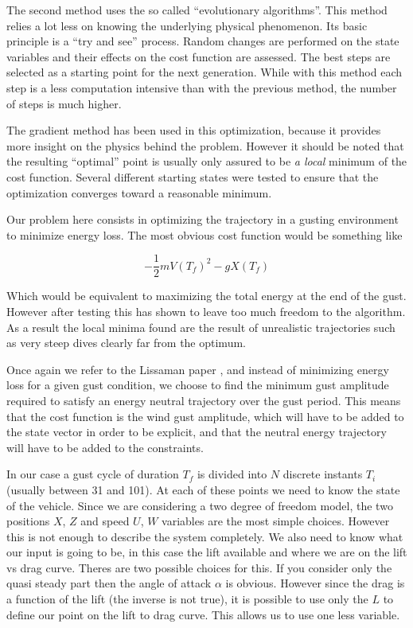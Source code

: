 \par The second method uses the so called ``evolutionary algorithms''. 
This method relies a lot less on knowing the underlying physical phenomenon.
Its basic principle is a ``try and see'' process.
Random changes are performed on the state variables and their effects on the cost function are assessed.
The best steps are selected as a starting point for the next generation.
While with this method each step is a less computation intensive than with the previous method, the number of steps is much higher.

\par The gradient method has been used in this optimization, because it provides more insight on the physics behind the problem.
However it should be noted that the resulting ``optimal'' point is usually only assured to be \emph{a local} minimum of the cost function.
Several different starting states were tested to ensure that the optimization converges toward a reasonable minimum.

Our problem here consists in optimizing the trajectory in a gusting environment to minimize energy loss.
The most obvious cost function would be something like

\begin{equation}
  - \frac{1}{2}m{V(T_f)}^2 - gX(T_f)
  \label{eqn:eni_cost_fun}
\end{equation}

Which would be equivalent to maximizing the total energy at the end of the gust.
However after testing this has shown to leave too much freedom to the algorithm. 
As a result the local minima found are the result of unrealistic trajectories such as very steep dives clearly far from the optimum.

\par Once again we refer to the Lissaman paper \cite{Lissaman2007neutral}, and instead of minimizing energy loss for a given gust condition, we choose to find the minimum gust amplitude required to satisfy an energy neutral trajectory over the gust period.
This means that the cost function is the wind gust amplitude, which will have to be added to the state vector in order to be explicit, and that the neutral energy trajectory will have to be added to the constraints.

In our case a gust cycle of duration $T_f$ is divided into $N$ discrete instants $T_i$ (usually between 31 and 101).
At each of these points we need to know the state of the vehicle.
Since we are considering a two degree of freedom model, the two positions $X$, $Z$ and speed $U$, $W$ variables are the most simple choices.
However this is not enough to describe the system completely.
We also need to know what our input is going to be, in this case the lift available and where we are on the lift vs drag curve.
Theres are two possible choices for this.
If you consider only the quasi steady part then the angle of attack $\alpha$ is obvious.
However since the drag is a function of the lift (the inverse is not true), it is possible to use only the $L$ to define our point on the lift to drag curve.
This allows us to use one less variable.

